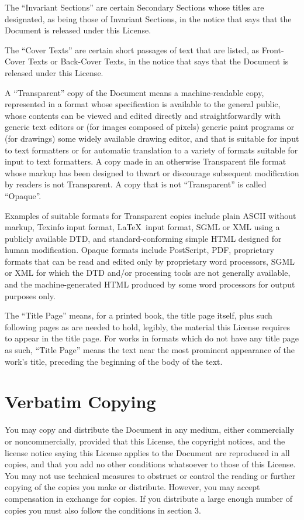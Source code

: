 \documentclass[a4paper,11pt,twoside,dvips]{report}
\begin{document}
The ``Invariant Sections'' are certain Secondary Sections whose titles
are designated, as being those of Invariant Sections, in the notice
that says that the Document is released under this License.

The ``Cover Texts'' are certain short passages of text that are listed,
as Front-Cover Texts or Back-Cover Texts, in the notice that says that
the Document is released under this License.

A ``Transparent'' copy of the Document means a machine-readable copy,
represented in a format whose specification is available to the
general public, whose contents can be viewed and edited directly and
straightforwardly with generic text editors or (for images composed of
pixels) generic paint programs or (for drawings) some widely available
drawing editor, and that is suitable for input to text formatters or
for automatic translation to a variety of formats suitable for input
to text formatters.  A copy made in an otherwise Transparent file
format whose markup has been designed to thwart or discourage
subsequent modification by readers is not Transparent.  A copy that is
not ``Transparent'' is called ``Opaque''.

Examples of suitable formats for Transparent copies include plain
ASCII without markup, Texinfo input format, \LaTeX~input format, SGML
or XML using a publicly available DTD, and standard-conforming simple
HTML designed for human modification.  Opaque formats include
PostScript, PDF, proprietary formats that can be read and edited only
by proprietary word processors, SGML or XML for which the DTD and/or
processing tools are not generally available, and the
machine-generated HTML produced by some word processors for output
purposes only.

The ``Title Page'' means, for a printed book, the title page itself,
plus such following pages as are needed to hold, legibly, the material
this License requires to appear in the title page.  For works in
formats which do not have any title page as such, ``Title Page'' means
the text near the most prominent appearance of the work's title,
preceding the beginning of the body of the text.


\section{Verbatim Copying}

You may copy and distribute the Document in any medium, either
commercially or noncommercially, provided that this License, the
copyright notices, and the license notice saying this License applies
to the Document are reproduced in all copies, and that you add no other
conditions whatsoever to those of this License.  You may not use
technical measures to obstruct or control the reading or further
copying of the copies you make or distribute.  However, you may accept
compensation in exchange for copies.  If you distribute a large enough
number of copies you must also follow the conditions in section 3.
\end{document}
